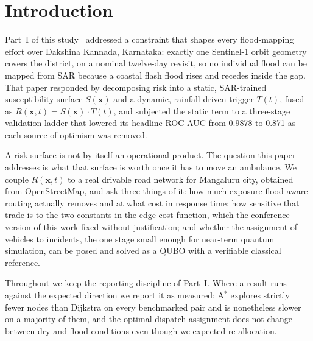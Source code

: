 \documentclass[journal]{IEEEtran}
\newcommand{\Sx}{S(\mathbf{x})}
\newcommand{\Tt}{T(t)}
\newcommand{\Rxt}{R(\mathbf{x},t)}
\begin{document}
\section{Introduction}
\label{sec:intro}
Part~I of this study~\cite{parti} addressed a constraint that shapes every
flood-mapping effort over Dakshina Kannada, Karnataka: exactly one Sentinel-1
orbit geometry covers the district, on a nominal twelve-day revisit, so no
individual flood can be mapped from SAR because a coastal flash flood rises and
recedes inside the gap. That paper responded by decomposing risk into a static,
SAR-trained susceptibility surface $\Sx$ and a dynamic, rainfall-driven trigger
$\Tt$, fused as $\Rxt=\Sx\cdot\Tt$, and subjected the static term to a
three-stage validation ladder that lowered its headline ROC-AUC from 0.9878 to
0.871 as each source of optimism was removed.

A risk surface is not by itself an operational product. The question this paper
addresses is what that surface is worth once it has to move an ambulance. We
couple $\Rxt$ to a real drivable road network for Mangaluru city, obtained from
OpenStreetMap, and ask three things of it: how much exposure flood-aware routing
actually removes and at what cost in response time; how sensitive that trade is
to the two constants in the edge-cost function, which the conference version of
this work fixed without justification; and whether the assignment of vehicles to
incidents, the one stage small enough for near-term quantum simulation, can be
posed and solved as a QUBO with a verifiable classical reference.

Throughout we keep the reporting discipline of Part~I. Where a result runs
against the expected direction we report it as measured: A$^\ast$ explores
strictly fewer nodes than Dijkstra on every benchmarked pair and is nonetheless
slower on a majority of them, and the optimal dispatch assignment does not
change between dry and flood conditions even though we expected re-allocation.
\end{document}
